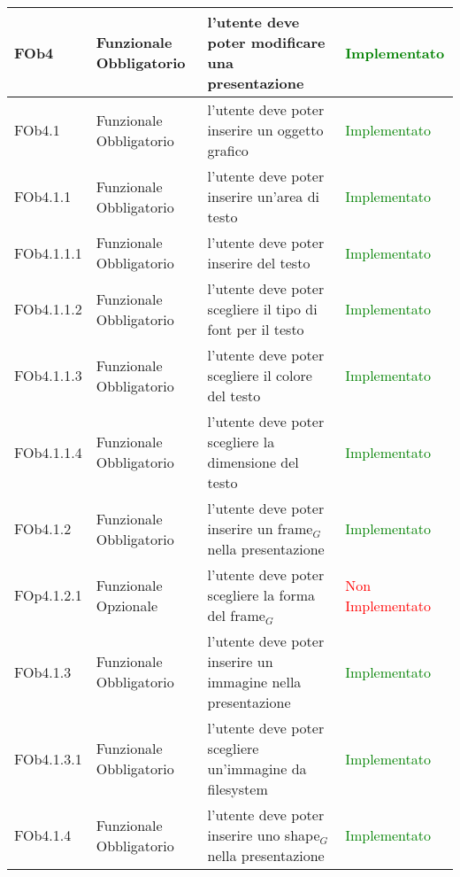 \begin{longtable}{|l|p{2.5cm}|p{5cm}|p{3.5cm}|}
\hline
FOb4 & Funzionale \linebreak Obbligatorio & l'utente deve poter modificare una presentazione & \textcolor{green}{Implementato} \\
\hline
FOb4.1 & Funzionale \linebreak Obbligatorio & l'utente deve poter inserire un oggetto grafico &\textcolor{green}{Implementato}  \\
\hline
FOb4.1.1 & Funzionale \linebreak Obbligatorio & l'utente deve poter inserire un'area di testo & \textcolor{green}{Implementato}  \\
\hline
FOb4.1.1.1 & Funzionale \linebreak Obbligatorio & l'utente deve poter inserire del testo & \textcolor{green}{Implementato}  \\
\hline
FOb4.1.1.2 & Funzionale \linebreak Obbligatorio & l'utente deve poter scegliere il tipo di font per il testo & \textcolor{green}{Implementato}  \\
\hline
FOb4.1.1.3 & Funzionale \linebreak Obbligatorio & l'utente deve poter scegliere il colore del testo & \textcolor{green}{Implementato}  \\
\hline
FOb4.1.1.4 & Funzionale \linebreak Obbligatorio & l'utente deve poter scegliere la dimensione del testo & \textcolor{green}{Implementato}  \\
\hline
FOb4.1.2 & Funzionale \linebreak Obbligatorio & l'utente deve poter inserire un frame$_G$ nella presentazione & \textcolor{green}{Implementato}  \\
\hline
FOp4.1.2.1 & Funzionale \linebreak Opzionale & l'utente deve poter scegliere la forma del frame$_G$ & \textcolor{red}{Non Implementato}  \\
\hline
FOb4.1.3 & Funzionale \linebreak Obbligatorio & l'utente deve poter inserire un immagine nella presentazione & \textcolor{green}{Implementato}  \\
\hline
FOb4.1.3.1 & Funzionale \linebreak Obbligatorio & l'utente deve poter scegliere un'immagine da filesystem & \textcolor{green}{Implementato}  \\
\hline
FOb4.1.4 & Funzionale \linebreak Obbligatorio & l'utente deve poter inserire uno shape$_G$ nella presentazione & \textcolor{green}{Implementato}  \\

\end{longtable}
